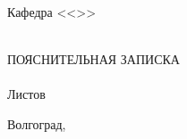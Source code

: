 {{{
\hfill
{}
\hfill
{}\\
\newpage
}
\clearpage
\thispagestyle{empty}
\begin{center}
\VSTUTitleHeading
Кафедра <<\VSTUDepartment>>\\
\end{center}
\vfill
\hfill\VSTUTitleHeadApproval
\vspace{8mm}
\begin{center}
\VSTUTitle\\
\vspace{\fill}
ПОЯСНИТЕЛЬНАЯ ЗАПИСКА\\
\vspace{8mm}
\VSTUDocumentCode\\
\vspace{8mm}
Листов \totalpages\\
\vspace{\fill}
\end{center}
\begin{flushright}
\VSTUTitleDirector
\end{flushright}
\vspace{8mm}
\begin{flushleft}
\VSTUTitleStandardsAdviser
\hfill
\VSTUTitleImplementer
\end{flushleft}
\vspace{\fill}
\begin{center}
Волгоград,~\the\year
\end{center}
\newpage
}
}
